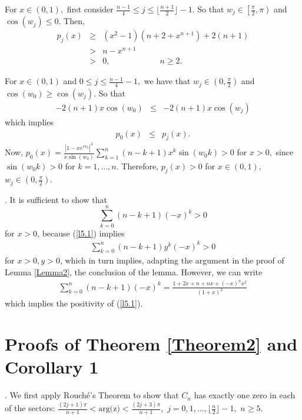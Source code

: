 \documentclass[final]{siamltex}
\begin{document}
 For $x \in (0,1),$ first consider $ \frac{n-1}{4} \leq j \leq \lfloor \frac{n+1}{2} \rfloor -1 .$ So that $w_{j} \in \left[ \frac{\pi}{2}, \pi \right)$ and $\cos(w_{j}) \leq 0.$  Then,
 \begin{eqnarray*} p_{j}(x) & \geq & (x^{2}-1)(n+2+x^{n+1}) + 2(n+1) \\
 & > & n - x^{n+1} \\
 & > & 0,  \hspace{1in} n \geq 2.
 \end{eqnarray*}

 For $x \in (0,1)$ and $ 0 \leq j \leq \frac{n-1}{4}-1,$ we have that $w_{j} \in (0, \frac{\pi}{2})$ and $\cos(w_{0}) \geq \cos(w_{j}).$ So that
  \begin{eqnarray*}  -2(n+1)x\cos(w_{0}) & \leq & -2(n+1)x\cos(w_{j}) 
 \end{eqnarray*} 
  which implies 
  \begin{eqnarray*}
     p_{0}(x) & \leq & p_{j}(x). 
  \end{eqnarray*}
 Now, $p_{0}(x) = \frac{ \left| 1-xe^{iw_{0}} \right|^{4} }{ x\sin(w_{0}) } \sum_{k=1}^{n} (n-k+1)x^{k}\sin(w_{0}k) > 0$ for $x > 0,$ since $\sin(w_{0}k) > 0$ for $k =1, \ldots, n.$
 Therefore, $p_{j}(x) > 0$ for $x \in (0,1),$ $w_{j} \in \left( 0, \frac{\pi}{2} \right).$ 


.  It is sufficient to show that 
\begin{equation}
\label{l5.1}
\sum_{k=0}^{n} (n-k+1){(-x)}^{k} > 0
\end{equation}
for $x > 0$, because (\ref{l5.1}) implies
\begin{eqnarray*}
\sum_{k=0}^{n} (n-k+1) {y}^k {(-x)}^{k} > 0
\end{eqnarray*}
for $x > 0, y > 0$, which in turn implies, adapting the argument in the proof of Lemma \ref{Lemma2}, 
the conclusion of the lemma.  However, we can write
\begin{eqnarray*}
\sum_{k=0}^{n} (n-k+1){(-x)}^{k}  = \frac{1 + 2x + n + nx + {(-x)}^n x^2}{(1+x)^2}
\end{eqnarray*}
which implies the positivity of (\ref{l5.1}).


\section{Proofs of Theorem \ref{Theorem2} and Corollary 1}

.   We first apply Rouch\'{e}'s Theorem to show that $C_{n}$ has exactly one zero in each of the sectors: $\frac{ (2j+1)\pi}{n+1} < \mbox{arg(z)} < \frac{ (2j+3)\pi}{n+1},$ $j = 0, 1, \ldots, \lfloor \frac{n}{2} \rfloor -1,$ $n \geq 5.$  
\end{document}
